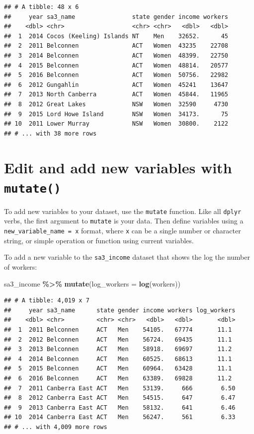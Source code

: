\documentclass[
]{book}
\newenvironment{Shaded}{\begin{snugshade}}{\end{snugshade}}
\newcommand{\DataTypeTok}[1]{\textcolor[rgb]{0.13,0.29,0.53}{#1}}
\newcommand{\KeywordTok}[1]{\textcolor[rgb]{0.13,0.29,0.53}{\textbf{#1}}}
\newcommand{\NormalTok}[1]{#1}
\newcommand{\OperatorTok}[1]{\textcolor[rgb]{0.81,0.36,0.00}{\textbf{#1}}}
\newcommand{\StringTok}[1]{\textcolor[rgb]{0.31,0.60,0.02}{#1}}
\begin{document}
\begin{verbatim}
## # A tibble: 48 x 6
##     year sa3_name                state gender income workers
##    <dbl> <chr>                   <chr> <chr>   <dbl>   <dbl>
##  1  2014 Cocos (Keeling) Islands NT    Men    32652.      45
##  2  2011 Belconnen               ACT   Women  43235    22708
##  3  2014 Belconnen               ACT   Women  48399.   22750
##  4  2015 Belconnen               ACT   Women  48814.   20577
##  5  2016 Belconnen               ACT   Women  50756.   22982
##  6  2012 Gungahlin               ACT   Women  45241    13647
##  7  2013 North Canberra          ACT   Women  45844.   11965
##  8  2012 Great Lakes             NSW   Women  32590     4730
##  9  2015 Lord Howe Island        NSW   Women  34173.      75
## 10  2011 Lower Murray            NSW   Women  30800.    2122
## # ... with 38 more rows
\end{verbatim}

\hypertarget{edit-and-add-new-variables-with-mutate}{%
\section{\texorpdfstring{Edit and add new variables with \texttt{mutate()}}{Edit and add new variables with mutate()}}\label{edit-and-add-new-variables-with-mutate}}

To add new variables to your dataset, use the \texttt{mutate} function. Like all \texttt{dplyr} verbs, the first argument to \texttt{mutate} is your data. Then define variables using a \texttt{new\_variable\_name\ =\ x} format, where \texttt{x} can be a single number or character string, or simple operation or function using current variables.

To add a new variable to the \texttt{sa3\_income} dataset that shows the log the number of workers:

\begin{Shaded}
\begin{Highlighting}[]
\NormalTok{sa3\_income }\OperatorTok{\%\textgreater{}\%}\StringTok{ }
\StringTok{  }\KeywordTok{mutate}\NormalTok{(}\DataTypeTok{log\_workers =} \KeywordTok{log}\NormalTok{(workers))}
\end{Highlighting}
\end{Shaded}

\begin{verbatim}
## # A tibble: 4,019 x 7
##     year sa3_name      state gender income workers log_workers
##    <dbl> <chr>         <chr> <chr>   <dbl>   <dbl>       <dbl>
##  1  2011 Belconnen     ACT   Men    54105.   67774       11.1 
##  2  2012 Belconnen     ACT   Men    56724.   69435       11.1 
##  3  2013 Belconnen     ACT   Men    58918.   69697       11.2 
##  4  2014 Belconnen     ACT   Men    60525.   68613       11.1 
##  5  2015 Belconnen     ACT   Men    60964.   63428       11.1 
##  6  2016 Belconnen     ACT   Men    63389.   69828       11.2 
##  7  2011 Canberra East ACT   Men    53139.     666        6.50
##  8  2012 Canberra East ACT   Men    54515.     647        6.47
##  9  2013 Canberra East ACT   Men    58132.     641        6.46
## 10  2014 Canberra East ACT   Men    56247.     561        6.33
## # ... with 4,009 more rows
\end{verbatim}
\end{document}

